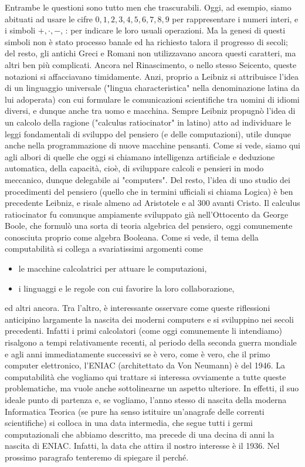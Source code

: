 Entrambe le questioni sono tutto men che trascurabili. Oggi, ad esempio, siamo
abituati ad usare le cifre $0, 1, 2, 3, 4, 5, 6, 7, 8, 9$ per rappresentare i numeri interi,
e i simboli $+, \cdot , -$, : per indicare le loro usuali operazioni. Ma la genesi di questi
simboli non è stato processo banale ed ha richiesto talora il progresso di secoli;
del resto, gli antichi Greci e Romani non utilizzavano ancora questi caratteri, ma
altri ben più complicati. Ancora nel Rinascimento, o nello stesso Seicento, queste notazioni si affacciavano timidamente.
Anzi, proprio a Leibniz si attribuisce l'idea di un linguaggio universale
("lingua characteristica" nella denominazione latina da lui adoperata) con cui formulare le comunicazioni scientifiche
tra uomini di idiomi diversi, e dunque anche tra uomo e macchina.
Sempre Leibniz propugnò l'idea di un calcolo della ragione ("calculus ratiocinator" in latino) atto ad individuare
le leggi fondamentali di sviluppo del pensiero (e delle computazioni), utile dunque anche nella programmazione di nuove
macchine pensanti. Come si vede, siamo qui agli albori di quelle che oggi si chiamano
intelligenza artificiale e deduzione automatica, della capacità, cioè, di sviluppare calcoli e pensieri in modo meccanico,
dunque delegabile ai "computers". Del resto, l'idea di uno studio dei procedimenti del pensiero
(quello che in termini ufficiali si chiama Logica) è ben precedente Leibniz, e risale almeno ad Aristotele e
al 300 avanti Cristo. Il calculus ratiocinator fu comunque ampiamente sviluppato
già nell'Ottocento da George Boole, che formulò una sorta di teoria algebrica del
pensiero, oggi comunemente conosciuta proprio come algebra Booleana.
Come si vede, il tema della computabilità si collega a svariatissimi argomenti
come

\begin{itemize}
    \item le macchine calcolatrici per attuare le computazioni,
    \item i linguaggi e le regole con cui favorire la loro collaborazione,
\end{itemize}

ed altri ancora. Tra l'altro, è interessante osservare come queste riflessioni anticipino largamente la nascita
dei moderni computers e si sviluppino nei secoli precedenti. Infatti i primi calcolatori
(come oggi comunemente li intendiamo) risalgono a tempi relativamente recenti, al periodo della seconda guerra mondiale e
agli anni immediatamente successivi se è vero, come è vero, che il primo computer elettronico, l'ENIAC
(architettato da Von Neumann) è del 1946.
La computabilità che vogliamo qui trattare si interessa ovviamente a tutte queste
problematiche, ma vuole anche sottolinearne un aspetto ulteriore. In effetti, il suo
ideale punto di partenza e, se vogliamo, l'anno stesso di nascita della moderna
Informatica Teorica (se pure ha senso istituire un'anagrafe delle correnti scientifiche) si colloca in una
data intermedia, che segue tutti i germi computazionali che abbiamo descritto,
ma precede di una decina di anni la nascita di ENIAC. Infatti,
la data che attira il nostro interesse è il 1936. Nel prossimo paragrafo tenteremo
di spiegare il perché.